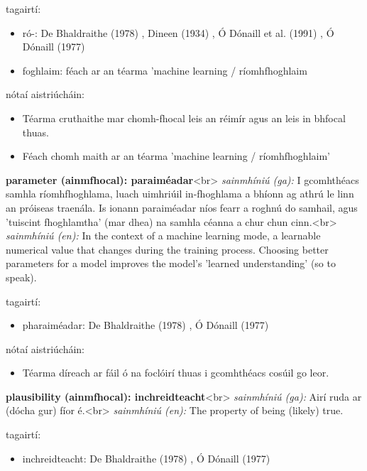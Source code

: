 \documentclass{article}
\begin{document}
tagairtí:
\begin{itemize}
	\item ró-: De Bhaldraithe (1978) \cite{de-bhaldraithe}, Dineen (1934) \cite{dineen}, Ó Dónaill et al. (1991) \cite{focloir-beag}, Ó Dónaill (1977) \cite{odonaill}
	\item foghlaim: féach ar an téarma 'machine learning / ríomhfhoghlaim
\end{itemize}

nótaí aistriúcháin:
\begin{itemize}
	\item Téarma cruthaithe mar chomh-fhocal leis an réimír agus an leis in bhfocal thuas.
	\item Féach chomh maith ar an téarma 'machine learning / ríomhfhoghlaim'
\end{itemize}


\textbf{parameter (ainmfhocal): paraiméadar}<br>
\textit{sainmhíniú (ga):} I gcomhthéacs samhla ríomhfhoghlama, luach uimhriúil in-fhoghlama a bhíonn ag athrú le linn an próiseas traenála. Is ionann paraiméadar níos fearr a roghnú do samhail, agus 'tuiscint fhoghlamtha' (mar dhea) na samhla céanna a chur chun cinn.<br>
\textit{sainmhíniú (en):} In the context of a machine learning mode, a learnable numerical value that changes during the training process. Choosing better parameters for a model improves the model's 'learned understanding' (so to speak).

tagairtí:
\begin{itemize}
	\item pharaiméadar: De Bhaldraithe (1978) \cite{de-bhaldraithe}, Ó Dónaill (1977) \cite{odonaill}
\end{itemize}

nótaí aistriúcháin:
\begin{itemize}
	\item Téarma díreach ar fáil ó na foclóirí thuas i gcomhthéacs cosúil go leor.
\end{itemize}


\textbf{plausibility (ainmfhocal): inchreidteacht}<br>
\textit{sainmhíniú (ga):} Airí ruda ar (dócha gur) fíor é.<br>
\textit{sainmhíniú (en):} The property of being (likely) true.

tagairtí:
\begin{itemize}
	\item inchreidteacht: De Bhaldraithe (1978) \cite{de-bhaldraithe}, Ó Dónaill (1977) \cite{odonaill}
\end{itemize}
\end{document}
